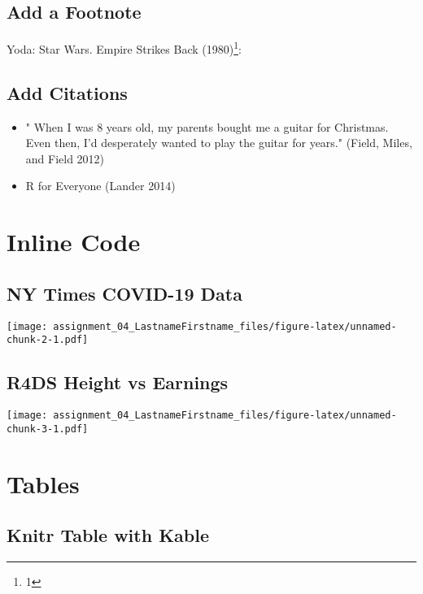 \documentclass[
]{article}
\begin{document}
\hypertarget{add-a-footnote}{%
\subsection{Add a Footnote}\label{add-a-footnote}}

Yoda: Star Wars. Empire Strikes Back (1980)\footnote{1}:

\hypertarget{add-citations}{%
\subsection{Add Citations}\label{add-citations}}

\begin{itemize}
\item
  " When I was 8 years old, my parents bought me a guitar for Christmas.
  Even then, I'd desperately wanted to play the guitar for years."
  (Field, Miles, and Field 2012)
\item
  R for Everyone (Lander 2014)
\end{itemize}

\hypertarget{inline-code}{%
\section{Inline Code}\label{inline-code}}

\hypertarget{ny-times-covid-19-data}{%
\subsection{NY Times COVID-19 Data}\label{ny-times-covid-19-data}}

\texttt{[image: assignment\_04\_LastnameFirstname\_files/figure-latex/unnamed-chunk-2-1.pdf]}

\hypertarget{r4ds-height-vs-earnings}{%
\subsection{R4DS Height vs Earnings}\label{r4ds-height-vs-earnings}}

\texttt{[image: assignment\_04\_LastnameFirstname\_files/figure-latex/unnamed-chunk-3-1.pdf]}

\hypertarget{tables}{%
\section{Tables}\label{tables}}

\hypertarget{knitr-table-with-kable}{%
\subsection{Knitr Table with Kable}\label{knitr-table-with-kable}}
\end{document}
